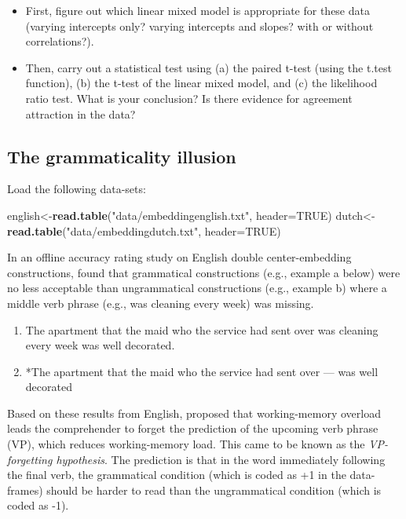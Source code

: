 \documentclass[12pt,]{krantz}
\newenvironment{Shaded}{\begin{snugshade}}{\end{snugshade}}
\newcommand{\DataTypeTok}[1]{\textcolor[rgb]{0.13,0.29,0.53}{#1}}
\newcommand{\KeywordTok}[1]{\textcolor[rgb]{0.13,0.29,0.53}{\textbf{#1}}}
\newcommand{\NormalTok}[1]{#1}
\newcommand{\OtherTok}[1]{\textcolor[rgb]{0.56,0.35,0.01}{#1}}
\newcommand{\StringTok}[1]{\textcolor[rgb]{0.31,0.60,0.02}{#1}}
\providecommand{\tightlist}{%
  \setlength{\itemsep}{0pt}\setlength{\parskip}{0pt}}
\begin{document}
\begin{itemize}
\tightlist
\item
  First, figure out which linear mixed model is appropriate for these data (varying intercepts only? varying intercepts and slopes? with or without correlations?).
\item
  Then, carry out a statistical test using (a) the paired t-test (using the t.test function), (b) the t-test of the linear mixed model, and (c) the likelihood ratio test. What is your conclusion? Is there evidence for agreement attraction in the data?
\end{itemize}

\hypertarget{sec:HypTestExerciseGramCE}{%
\subsection{The grammaticality illusion}\label{sec:HypTestExerciseGramCE}}

Load the following data-sets:

\begin{Shaded}
\begin{Highlighting}[]
\NormalTok{english<-}\KeywordTok{read.table}\NormalTok{(}\StringTok{"data/embeddingenglish.txt"}\NormalTok{,}
                    \DataTypeTok{header=}\OtherTok{TRUE}\NormalTok{)}
\NormalTok{dutch<-}\KeywordTok{read.table}\NormalTok{(}\StringTok{"data/embeddingdutch.txt"}\NormalTok{,}
                  \DataTypeTok{header=}\OtherTok{TRUE}\NormalTok{)}
\end{Highlighting}
\end{Shaded}

In an offline accuracy rating study on English double center-embedding constructions, \citet{gibsonthomas99} found that grammatical constructions (e.g., example a below) were no less acceptable than ungrammatical constructions (e.g., example b) where a middle verb phrase (e.g., was cleaning every week) was missing.

\begin{enumerate}
\def\labelenumi{(\alph{enumi})}
\item
  The apartment that the maid who the service had sent over was cleaning every week was well decorated.
\item
  *The apartment that the maid who the service had sent over --- was well decorated
\end{enumerate}

Based on these results from English, \citet{gibsonthomas99} proposed that working-memory overload leads the comprehender to forget the prediction of the upcoming verb phrase (VP), which reduces working-memory load. This came to be known as the \emph{VP-forgetting hypothesis}. The prediction is that in the word immediately following the final verb, the grammatical condition (which is coded as +1 in the data-frames) should be harder to read than the ungrammatical condition (which is coded as -1).
\end{document}
